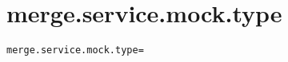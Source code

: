 \section{merge.service.mock.type}
\label{configuration:MergeServiceMockType}
\AvailableInCsharpOnly{\TODO}
\begin{lstlisting}[style=Props,caption={Usage example for \textit{merge.service.mock.type}}]
merge.service.mock.type=
\end{lstlisting}